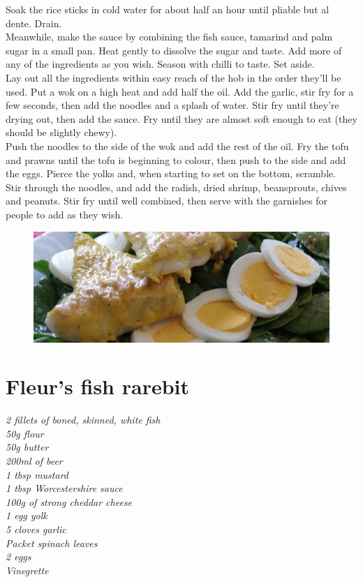 \documentclass{tufte-book}
\begin{document}
\smallskip
Soak the rice sticks in cold water for about half an hour until pliable but al dente. Drain.
\\Meanwhile, make the sauce by combining the fish sauce, tamarind and palm sugar in a small pan. Heat gently to dissolve the sugar and taste. Add more of any of the ingredients as you wish. Season with chilli to taste. Set aside.
\\Lay out all the ingredients within easy reach of the hob in the order they'll be used. Put a wok on a high heat and add half the oil. Add the garlic, stir fry for a few seconds, then add the noodles and a splash of water. Stir fry until they're drying out, then add the sauce. Fry until they are almost soft enough to eat (they should be slightly chewy).
\\Push the noodles to the side of the wok and add the rest of the oil. Fry the tofu and prawns until the tofu is beginning to colour, then push to the side and add the eggs. Pierce the yolks and, when starting to set on the bottom, scramble.
\\Stir through the noodles, and add the radish, dried shrimp, beansprouts, chives and peanuts. Stir fry until well combined, then serve with the garnishes for people to add as they wish.

\newpage


\begin{figure}[h]
  \includegraphics[width=\linewidth]{fleurs.JPG}%
\end{figure}

\section{Fleur's fish rarebit}

\emph{2 fillets of boned, skinned, white fish
\\50g flour
\\50g butter
\\200ml of beer
\\1 tbsp mustard
\\1 tbsp Worcestershire sauce
\\100g of strong cheddar cheese
\\1 egg yolk
\\5 cloves garlic
\\Packet spinach leaves
\\2 eggs
\\Vinegrette
}
\end{document}
